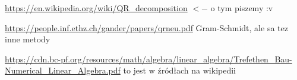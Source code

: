 \documentclass[11pt, wide, leqno]{mwart}
\begin{document}
\maketitle
\tableofcontents

\url{https://en.wikipedia.org/wiki/QR_decomposition} $<-$ o tym piszemy :v

\url{https://people.inf.ethz.ch/gander/papers/qrneu.pdf} Gram-Schmidt, ale sa tez inne metody

\url{https://cdn.bc-pf.org/resources/math/algebra/linear_algebra/Trefethen_Bau-Numerical_Linear_Algebra.pdf} to jest w źródłach na wikipedii
\end{document}
